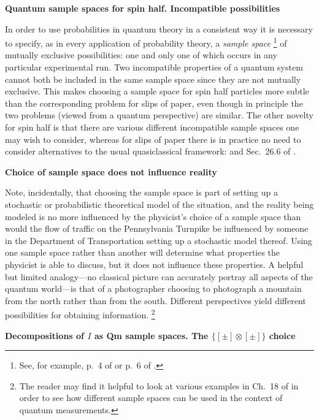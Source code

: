 \documentclass[10pt]{article} %
\def\outl#1{\par{\medskip\noindent\hspace*{.5cm}\bf
      \mathversion{bold}#1\mathversion{normal}\smallskip} }
\def\np{} \def\xa{} \def\xb{} \def\xn{} \def\xp{}
\def\outl#1{} \def\np{} \def\xa{} \def\xb{} \def\xn{} \def\xp{}
\def\outl#1{\par{\medskip\noindent\hspace*{.5cm}\bf
      \mathversion{bold}#1\mathversion{normal}\smallskip} }
\def\np{\newpage }\def\xn{\nopagebreak }\def\xp{\pagebreak }
\newcommand{\ot}{\otimes }
\begin{document}
\xb
\outl{Quantum sample spaces for spin half.  Incompatible possibilities}
\xa



In order to use probabilities in quantum theory in a consistent way it is
necessary to specify, as in every application of probability theory, a
\emph{sample space}%
\footnote{See, for example, p.~4 of \cite{Fllr68} or p.~6 of \cite{DGSc02}.} %
of mutually exclusive possibilities: one and only one of which occurs in any
particular experimental run.  Two incompatible properties of a quantum system
cannot both be included in the same sample space since they are not mutually
exclusive.  This makes choosing a sample space for spin half particles more
subtle than the corresponding problem for slips of paper, even though in
principle the two problems (viewed from a quantum perspective) are similar.
The other novelty for spin half is that there are various different
incompatible sample spaces one may wish to consider, whereas for slips of
paper there is in practice no need to consider alternatives to the usual
quasiclassical framework:
%
\cite{GMHr90,GMHr93,GMHr07} and Sec.~26.6 of \cite{Grff02c}.  

\xb
\outl{Choice of sample space does not influence reality}
\xa

Note, incidentally, that choosing the sample space is part of setting up a
stochastic or probabilistic theoretical model of the situation, and the
reality being modeled is no more influenced by the physicist's choice of a
sample space than would the flow of traffic on the Pennsylvania Turnpike be
influenced by someone in the Department of Transportation setting up a
stochastic model thereof.  Using one sample space rather than another will
determine what properties the physicist is able to discuss, but it does not
influence these properties. A helpful but limited analogy---no classical
picture can accurately portray all aspects of the quantum world---is that of a
photographer choosing to photograph a mountain from the north rather than from
the south.  Different perspectives yield different possibilities for obtaining
information.%
\footnote{The reader may find it helpful to look at various examples in Ch.~18
  of \cite{Grff02c} in order to see how different sample spaces can be used
  in the context of quantum measurements.} %

 \xb 
\outl{Decompositions of $I$ as Qm sample spaces.  The $\{[\pm]\ot[\pm]\}$
  choice} 
\xa
\end{document}
